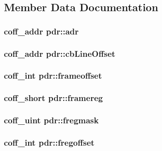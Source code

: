 \subsection{Member Data Documentation}
\hypertarget{structpdr_a9683304f0fe296f7a483bac5bd75068e}{
\subsubsection[{adr}]{\setlength{\rightskip}{0pt plus 5cm}coff\_\-addr {\bf pdr::adr}}}
\label{structpdr_a9683304f0fe296f7a483bac5bd75068e}
\hypertarget{structpdr_add45eb5247cbbbf3ae585ab75dc46a88}{
\subsubsection[{cbLineOffset}]{\setlength{\rightskip}{0pt plus 5cm}coff\_\-addr {\bf pdr::cbLineOffset}}}
\label{structpdr_add45eb5247cbbbf3ae585ab75dc46a88}
\hypertarget{structpdr_ac824eab7b6364b2ae3af8c6d7e38a2da}{
\subsubsection[{frameoffset}]{\setlength{\rightskip}{0pt plus 5cm}coff\_\-int {\bf pdr::frameoffset}}}
\label{structpdr_ac824eab7b6364b2ae3af8c6d7e38a2da}
\hypertarget{structpdr_add996655f684759d34d998e71d5d0fb8}{
\subsubsection[{framereg}]{\setlength{\rightskip}{0pt plus 5cm}coff\_\-short {\bf pdr::framereg}}}
\label{structpdr_add996655f684759d34d998e71d5d0fb8}
\hypertarget{structpdr_a3ed6548a5447fbb82280230245a5970e}{
\subsubsection[{fregmask}]{\setlength{\rightskip}{0pt plus 5cm}coff\_\-uint {\bf pdr::fregmask}}}
\label{structpdr_a3ed6548a5447fbb82280230245a5970e}
\hypertarget{structpdr_ac55e86e06de10940df4f9acd6c6daec5}{
\subsubsection[{fregoffset}]{\setlength{\rightskip}{0pt plus 5cm}coff\_\-int {\bf pdr::fregoffset}}}
